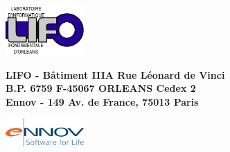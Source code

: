 {\begin{sffamily}
\begin{minipage}{3cm}
\includegraphics[width=3cm]{logos/logoLIFO.png} 
\end{minipage}
\hfill
\begin{minipage}{9cm}
\centering
\textbf{LIFO - Bâtiment IIIA Rue Léonard de Vinci \\B.P. 6759 F-45067 ORLEANS Cedex 2}\\
\textbf{Ennov - 149 Av. de France, 75013 Paris}
\end{minipage}
\hfill
\begin{minipage}{3cm}
\includegraphics[width=3cm]{logos/logoEnnov.png}
\end{minipage}

\end{sffamily}
}
